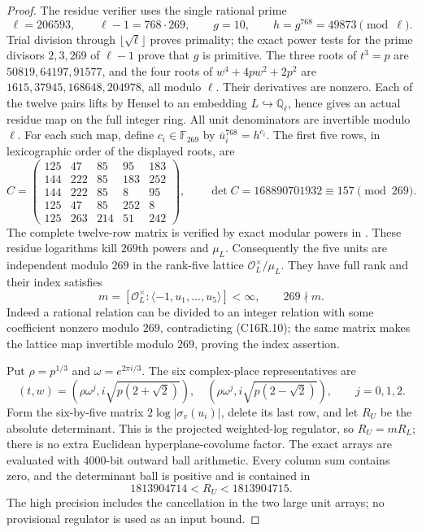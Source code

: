 \begin{proof}
The residue verifier uses the single rational prime
\[
 \ell=206593,\qquad \ell-1=768\cdot269,
 \qquad g=10,\qquad h=g^{768}=49873\pmod\ell.
 \tag{C16R.9}
\]
Trial division through $\lfloor\sqrt\ell\rfloor$ proves primality;
the exact power tests for the prime divisors $2,3,269$ of
$\ell-1$ prove that $g$ is primitive.  The three roots of $t^3=p$
are $50819,64197,91577$, and the four roots of $w^4+4pw^2+2p^2$
are $1615,37945,168648,204978$, all modulo $\ell$.
Their derivatives are nonzero.  Each of the twelve pairs lifts
by Hensel to an embedding $L\hookrightarrow\mathbb Q_\ell$,
hence gives an actual residue map on the full integer ring.
All unit denominators are invertible modulo $\ell$.
For each such map, define $c_i\in\mathbb F_{269}$ by
$\bar u_i^{768}=h^{c_i}$.
The first five rows, in lexicographic order of the displayed roots, are
\[
 C=\begin{pmatrix}
125&47&85&95&183\\
144&222&85&183&252\\
144&222&85&8&95\\
125&47&85&252&8\\
125&263&214&51&242
\end{pmatrix},\qquad
 \det C=168890701932\equiv157\pmod{269}.
 \tag{C16R.10}
\]
The complete twelve-row matrix is verified by exact modular powers
in .
These residue logarithms kill $269$th powers and $\mu_L$.
Consequently the five units are independent modulo $269$ in the
rank-five lattice $\mathcal O_L^\times/\mu_L$.
They have full rank and their index satisfies
\[
 m=[\mathcal O_L^\times:\langle-1,u_1,\ldots,u_5\rangle]<\infty,
                         \qquad269\nmid m.
 \tag{C16R.11}
\]
Indeed a rational relation can be divided to an integer relation
with some coefficient nonzero modulo $269$, contradicting
(C16R.10); the same matrix makes the lattice map invertible
modulo $269$, proving the index assertion.

Put $\rho=p^{1/3}$ and $\omega=e^{2\pi i/3}$.
The six complex-place representatives are
\[
 (t,w)=(\rho\omega^j,i\sqrt{p(2+\sqrt2)}),\quad
       (\rho\omega^j,i\sqrt{p(2-\sqrt2)}),\qquad j=0,1,2.
 \tag{C16R.12}
\]
Form the six-by-five matrix $2\log|\sigma_v(u_i)|$, delete
its last row, and let $R_U$ be the absolute determinant.
This is the projected weighted-log regulator, so $R_U=mR_L$;
there is no extra Euclidean hyperplane-covolume factor.
The exact arrays are evaluated with $4000$-bit outward ball
arithmetic.  Every column sum contains zero, and the determinant
ball is positive and is contained in
\[
                       1813904714<R_U<1813904715.
 \tag{C16R.13}
\]
The high precision includes the cancellation in the two large
unit arrays; no provisional regulator is used as an input bound.


\end{proof}
